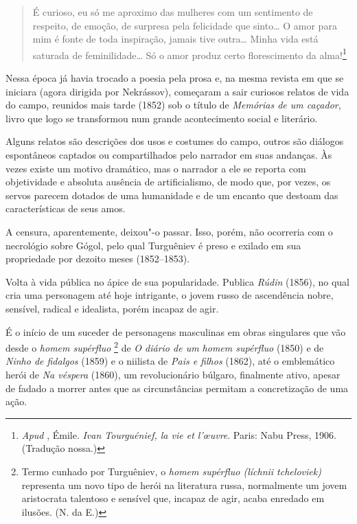 \begin{quote}
É curioso, eu só me aproximo das mulheres com um sentimento de
respeito, de emoção, de surpresa pela felicidade que sinto\ldots{} O amor para
mim é fonte de toda inspiração, jamais tive outra\ldots{} Minha vida está
saturada de feminilidade\ldots{} Só o amor produz certo florescimento da
alma!\footnote{\emph{Apud} , Émile. \emph{Ivan Tourguénief, la vie et l'œuvre}.
Paris: Nabu Press, 1906. (Tradução nossa.)}
\end{quote}

Nessa época já havia trocado a poesia pela prosa e, na mesma revista
em que se iniciara (agora dirigida por Nekrássov), começaram a sair curiosos relatos de vida do
campo, reunidos mais tarde (1852) sob o título de \emph{Memórias
de um caçador}, livro que logo se transformou num grande acontecimento social
e literário.

Alguns relatos são descrições dos usos e costumes do campo, outros são diálogos
espontâneos captados ou compartilhados pelo narrador em suas andanças.
Às vezes existe um motivo dramático, mas o narrador a ele se
reporta com objetividade e absoluta ausência de artificialismo, de modo
que, por vezes, os servos parecem dotados de uma humanidade e de um encanto
que destoam das características de seus amos.

A censura, aparentemente, deixou"-o passar. Isso, porém, não ocorreria com o necrológio
sobre Gógol, pelo qual Turguêniev é preso e exilado em sua propriedade
por dezoito meses (1852--1853).

Volta à vida pública no ápice de sua popularidade. Publica \emph{Rúdin} (1856), no qual cria uma personagem até hoje
intrigante, o jovem russo de ascendência nobre, sensível, radical e
idealista, porém incapaz de agir.

É o início de um suceder de personagens masculinas em obras
singulares que vão desde o \emph{homem supérfluo}
\footnote{Termo cunhado por Turguêniev, o \emph{homem supérfluo
(líchnii tcheloviek)} representa um novo tipo de herói na
literatura russa, normalmente um jovem aristocrata talentoso e
sensível que, incapaz de agir, acaba enredado em ilusões.
(N. da E.)} de \emph{O diário de um
homem supérfluo} (1850) e de \emph{Ninho de fidalgos} (1859) e o niilista de
\emph{Pais e filhos} (1862), até o emblemático herói de \emph{Na véspera}
(1860), um revolucionário búlgaro, finalmente ativo, apesar de fadado a
morrer antes que as circunstâncias permitam a concretização de uma ação.

